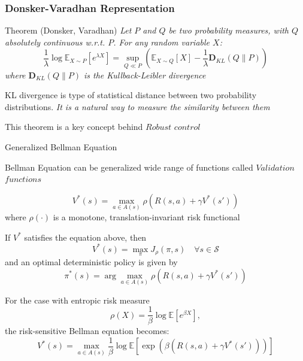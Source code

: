 \documentclass[10pt]{beamer}
\begin{document}
\begin{frame}
    \frametitle{Donsker-Varadhan Representation}

\begin{block}{Theorem (Donsker, Varadhan)}
    \textit{Let \( P \) and \( Q \) be two probability measures, with \( Q \) absolutely continuous w.r.t. \( P \).  
    For any random variable \( X \):
    \[
    \frac{1}{\lambda}\log \mathbb{E}_{X \sim P} [e^{\lambda X}] = \sup_{Q \ll P} \left( \mathbb{E}_{X \sim Q} [X] - \frac{1}{\lambda}\mathbf{D}_{KL}(Q\|P) \right)
    \]
where $\mathbf{D}_{KL}(Q\|P)$ is the Kullback-Leibler divergence}
\end{block}

    \bigskip
    
    KL divergence is type of statistical distance between two probability distributions. \textit{It is a natural way to measure the similarity between them}
    
    \bigskip
    
    \pause
    This theorem is a key concept behind $Robust$ $control$
\end{frame}

\begin{frame}{Generalized Bellman Equation}


    Bellman Equation can be generalized wide range of functions called $Validation$ $functions$

    \[
    V^*(s) = \max_{a \in A(s)} \rho(R(s,a) + \gamma V^*(s'))
    \]
    where \(\rho(\cdot)\) is a monotone, translation-invariant risk functional
\pause
    \bigskip

    If \(V^*\) satisfies the equation above, then
    \[
    V^*(s) = \max_{\pi} J_\rho(\pi,s) \quad \forall s \in \mathcal{S}
    \]
    and an optimal deterministic policy is given by
    \[
    \pi^*(s) = \arg \max_{a \in A(s)} \rho(R(s,a) + \gamma V^*(s'))
    \]
\end{frame}

\begin{frame}

    For the case with entropic risk measure
    \[
    \rho(X) = \frac{1}{\beta} \log \mathbb{E} \left[ e^{\beta X} \right],
    \]
    the risk-sensitive Bellman equation becomes:  
    \[
    V^*(s) = \max_{a \in A(s)} \frac{1}{\beta} \log \mathbb{E}\left[ \exp \left( \beta (R(s, a) + \gamma V^*(s')) \right) \right]
    \]
\end{frame}
\end{document}
